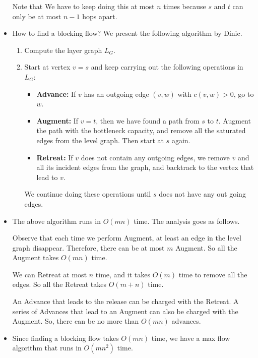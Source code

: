 \documentclass[10pt]{article}
\begin{document}
\begin{itemize}
        Note that We have to keep doing this at most $n$ times
        because $s$ and $t$ can only be at most $n-1$ hops apart.
        
      \item How to find a blocking flow? We present the following
        algorithm by Dinic.
        
        \begin{enumerate}
          \item Compute the layer graph $L_G.$
          
          \item Start at vertex $v = s$ and keep carrying out the following operations in $L_G$:
            \begin{itemize}
              \item {\bf Advance:} If $v$ has an outgoing edge $(v,w)$ with $c(v,w) > 0$,
                go to $w$.
              
              \item {\bf Augment:} If $v = t$, then we have found a path from $s$ to $t$.
                Augment the path with the bottleneck capacity, and remove all the
                saturated edges from the level graph. Then start at $s$ again.
                
              \item {\bf Retreat:} If $v$ does not contain any outgoing edges,
                we remove $v$ and all its incident edges from the graph, 
                and backtrack to the vertex that lead to $v$.
            \end{itemize}
            
            We continue doing these operations until $s$ does not have any 
            out going edges.
        \end{enumerate}
        
      \item The above algorithm runs in $O(mn)$ time. The analysis goes 
        as follows.
      
        Observe that each time we perform Augment, at least an edge in
        the level graph disappear. Therefore, there can be at most $m$
        Augment. So all the Augment takes $O(mn)$ time.
        
        We can Retreat at most $n$ time, and it takes $O(m)$ time
        to remove all the edges. So all the Retreat takes $O(m+n)$ time.
        
        An Advance that leads to the release can be charged with
        the Retreat. A series of Advances that lead to an Augment
        can also be charged with the Augment. So, there can be
        no more than $O(mn)$ advances.
      
      \item Since finding a blocking flow takes $O(mn)$ time,
        we have a max flow algorithm that runs in $O(mn^2)$ time.
        
    \end{itemize}
  
\end{document}

